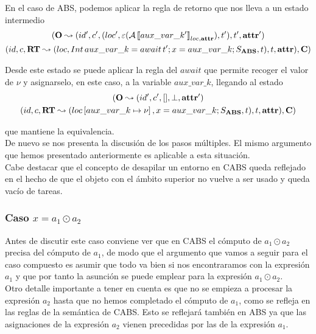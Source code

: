 En el caso de ABS, podemos aplicar la regla de retorno que nos lleva a un estado intermedio
\begin{multline*}
  (\mathbf{O} \leadsto (id', c', (loc', \varepsilon(\mathcal{A} \left\llbracket aux\_var\_k' \right\rrbracket_{loc, \textbf{attr}}), t'), t', \textbf{attr}')\\
  (id, c, \textbf{RT} \leadsto (loc, Int\, aux\_var\_k = await\,t'\mbox{;\,} x = aux\_var\_k\mbox{;\,} S_{\textbf{ABS}}, t), t, \textbf{attr}), \mathbf{C})
\end{multline*}

Desde este estado se puede aplicar la regla del $await$ que permite recoger el valor de $\nu$ y asignarselo, en este caso, a la variable $aux\_var\_k$, llegando al estado
\begin{multline*}
  (\mathbf{O} \leadsto (id', c', [], \perp, \textbf{attr}')\\
  (id, c, \textbf{RT} \leadsto (loc\left[ aux\_var\_k\mapsto\nu \right], x = aux\_var\_k\mbox{;\,} S_{\textbf{ABS}}, t), t, \textbf{attr}), \mathbf{C})
\end{multline*}

que mantiene la equivalencia.\\

De nuevo se nos presenta la discusión de los pasos múltiples. El mismo argumento que hemos presentado anteriormente es aplicable a esta situación.\\

Cabe destacar que el concepto de desapilar un entorno en CABS queda reflejado en el hecho de que el objeto con el ámbito superior no vuelve a ser usado y queda vacío de tareas.

\subsubsection{Caso $x = a_1 \odot a_2$}

Antes de discutir este caso conviene ver que en CABS el cómputo de $a_1 \odot a_2$ precisa del cómputo de $a_1$, de modo que el argumento que vamos a seguir para el caso compuesto es asumir que todo va bien si nos encontraramos con la expresión $a_1$ y que por tanto la asunción se puede emplear para la expresión $a_1 \odot a_2$.\\

Otro detalle importante a tener en cuenta es que no se empieza a procesar la expresión $a_2$ hasta que no hemos completado el cómputo de $a_1$, como se refleja en las reglas de la semántica de CABS. Esto se reflejará también en ABS ya que las asignaciones de la expresión $a_2$ vienen precedidas por las de la expresión $a_1$.\\

